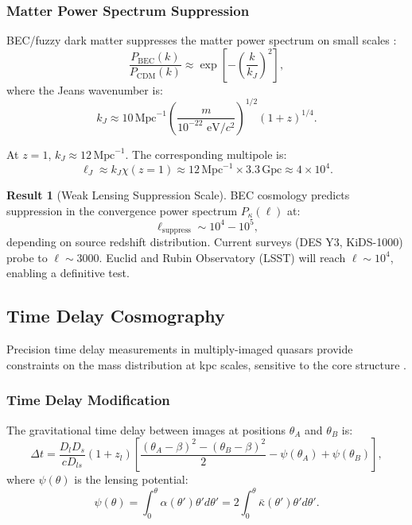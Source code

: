 \documentclass[11pt,a4paper]{article}
\newcommand{\Mpc}{\ensuremath{\mathrm{Mpc}}}
\newcommand{\Gpc}{\ensuremath{\mathrm{Gpc}}}
\theoremstyle{definition}
\newtheorem{result}{Result}[section]
\theoremstyle{remark}
\begin{document}
\subsubsection{Matter Power Spectrum Suppression}

BEC/fuzzy dark matter suppresses the matter power spectrum on small scales \cite{Hu2000}:
\begin{equation}
\frac{P_{\mathrm{BEC}}(k)}{P_{\mathrm{CDM}}(k)} \approx \exp\left[-\left(\frac{k}{k_J}\right)^2\right],
\end{equation}
where the Jeans wavenumber is:
\begin{equation}
k_J \approx 10 \, \Mpc^{-1} \left(\frac{m}{10^{-22} \text{ eV}/c^2}\right)^{1/2} (1+z)^{1/4}.
\end{equation}

At $z = 1$, $k_J \approx 12 \, \Mpc^{-1}$. The corresponding multipole is:
\begin{equation}
\ell_J \approx k_J \chi(z=1) \approx 12 \, \Mpc^{-1} \times 3.3 \, \Gpc \approx 4 \times 10^4.
\end{equation}

\begin{result}[Weak Lensing Suppression Scale]
\label{res:weak_lensing_suppression}
BEC cosmology predicts suppression in the convergence power spectrum $P_\kappa(\ell)$ at:
\begin{equation}
\boxed{\ell_{\mathrm{suppress}} \sim 10^4 - 10^5,}
\end{equation}
depending on source redshift distribution. Current surveys (DES Y3, KiDS-1000) probe to $\ell \sim 3000$. Euclid and Rubin Observatory (LSST) will reach $\ell \sim 10^4$, enabling a definitive test.
\end{result}

\subsection{Time Delay Cosmography}
\label{sec:time_delay_obs}

Precision time delay measurements in multiply-imaged quasars provide constraints on the mass distribution at kpc scales, sensitive to the core structure \cite{Suyu2010,Wong2020}.

\subsubsection{Time Delay Modification}

The gravitational time delay between images at positions $\theta_A$ and $\theta_B$ is:
\begin{equation}
\Delta t = \frac{D_l D_s}{cD_{ls}}(1+z_l) \left[\frac{(\theta_A - \beta)^2 - (\theta_B - \beta)^2}{2} - \psi(\theta_A) + \psi(\theta_B)\right],
\end{equation}
where $\psi(\theta)$ is the lensing potential:
\begin{equation}
\psi(\theta) = \int_0^\theta \alpha(\theta') \theta' d\theta' = 2\int_0^\theta \bar{\kappa}(\theta') \theta' d\theta'.
\end{equation}
\end{document}
